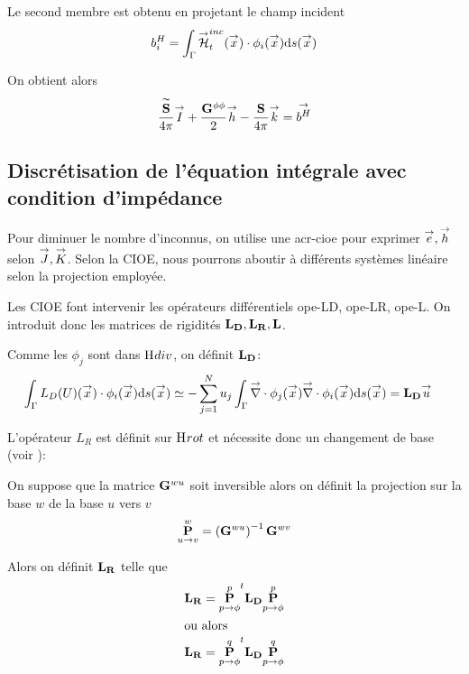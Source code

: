       Le second membre est obtenu en projetant le champ incident 
      \begin{equation}
        b_i^H = \int_\Gamma \vH^{inc}_t(\vx) \cdot \phi_i(\vx)\dd{s}(\vx)
      \end{equation}

      On obtient alors 
      \begin{equation}
        \frac{\mSt}{4\pi}\vect{I} 
        + \frac{\mG{\phi}{\phi}}{2}\vect{h}
        - \frac{\mS}{4\pi}\vect{k} 
        = \vect{b^H}
      \end{equation}

  \subsection{Discrétisation de l'équation intégrale avec condition d'impédance}
    Pour diminuer le nombre d'inconnus, on utilise une \gls{acr-cioe} pour exprimer \(\vect{e}, \vect{h}\) selon \(\vect{J}, \vect{K}\). Selon la CIOE, nous pourrons aboutir à différents systèmes linéaire selon la projection employée. 

    Les CIOE font intervenir les opérateurs différentiels \gls{ope-LD}, \gls{ope-LR}, \gls{ope-L}. On introduit donc les matrices de rigidités \(\mLD,\mLR,\mL\).

    Comme les \(\phi_j\) sont dans \(\Hdiv\), on définit \(\mLD\):
    \begin{align}
      \int_\Gamma L_D(U)(\vx) \cdot \phi_i(\vx) \dd{s}(\vx)  
        & \simeq - \sum_{j=1}^N u_j \int_\Gamma \vdiv \phi_j(\vx) \vdiv \phi_i(\vx) \dd{s}(\vx) = \mLD \vu
    \end{align}

    L'opérateur \(L_R\) est définit sur \(\Hrot\) et nécessite donc un changement de base (voir \cite[(13)]{stupfel_implementation_2015}):

    \begin{defn}
      On suppose que la matrice \(\mG{w}{u}\) soit inversible alors on définit la projection sur la base \(w\) de la base \(u\) vers \(v\)
      \begin{align}
        \mP{u}{v}{w} &= \left(\mG{w}{u}\right)^{-1}\mG{w}{v} \\
      \end{align}
    \end{defn}

    Alors on définit \(\mLR\) telle que
    \begin{align}
      \mLR & = \mP{p}{\phi}{p}^t\mLD\mP{p}{\phi}{p} \\
      \intertext{ou alors}
      \mLR & = \mP{p}{\phi}{q}^t\mLD\mP{p}{\phi}{q} 
    \end{align}

